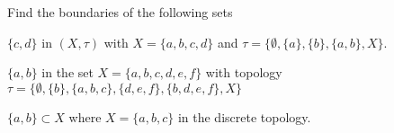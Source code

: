\begin{activity} \label{act:TS_boundaries} Find the boundaries of the following sets
\ba
\item $\{c,d\}$ in $(X, \tau)$ with $X= \{a,b,c,d\}$ and $\tau = \{\emptyset, \{a\}, \{b\}, \{a,b\}, X \}$.



\begin{comment}

\solution Neither $a$ nor $b$ is a boundary point of $\{c,d\}$ since the open neighborhood $\{a,b\}$ contains no point in $\{c,d\}$. The only open set that contains $c$ or $d$ is $X$, so that is the only neighborhood of $c$ or $d$. Since $X$ contains a point in $\{c,d]{$ that is different than $c$ (or $d$), and a point not in $\{c,d\}$, both $c$ and $d$ are boundary points of $\{c,d\}$. Therefore, $\Bdry(\{c,d\}) = \{c,d\}$. 




\end{comment}



\item $\{a,b\}$ in the set $X= \{a,b,c,d,e,f\}$ with topology $\tau= \{\emptyset,\{b\}, \{a,b,c\},\{d,e,f\},\{b,d,e,f\}, X\}$ 



\begin{comment}

\solution None of the points $d$, $e$, or $f$ is a boundary point of $\{a,b\}$ since the open neighborhood $\{d,e,f\}$ contains no point in $\{a,b\}$. The open neighborhood $\{b\}$ of $b$ contains no points that are not in $\{a,b\}$, so $b$ is not a boundary point of $\{a,b\}$. Any neighborhood of $a$ or $c$ must contain one of the open sets $\{a,b,c\}$ or $X$. So every neighborhood of $a$ or $c$ contains a point of $\{a,b\}$ and a point not in $\{a,b\}$. So $a$ and $c$ are boundary points of $\{a,b\}$. Therefore, $\Bdry(\{a,b\}) = \{a,c\}$.  




\end{comment}


\item $\{a,b\} \subset X$ where $X = \{a,b,c\}$ in the discrete topology. 



\begin{comment}

\solution For any $x \in \{a,b\}$, the open neighborhood $\{x\}$ of $x$ does not contain any points in $\{a,b\}$ different than $x$. So the set $\{a,b\}$ has no limit points. 




\end{comment}
\end{activity}
